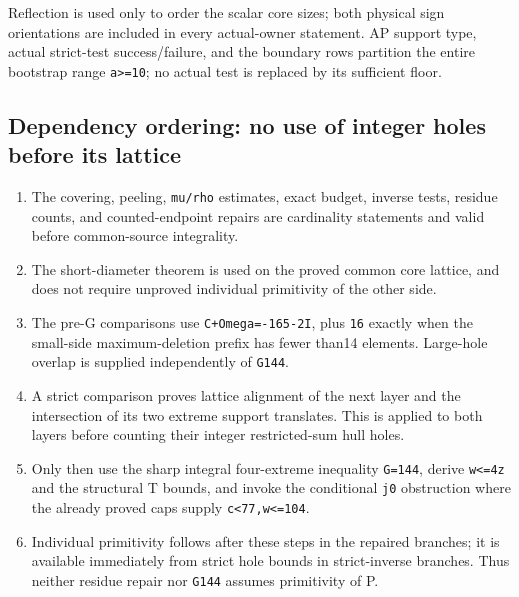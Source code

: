 \documentclass[10pt,a4paper]{article}
\theoremstyle{definition}
\providecommand{\tightlist}{\setlength{\itemsep}{0pt}\setlength{\parskip}{0pt}}
\begin{document}
Reflection is used only to order the scalar core sizes; both physical
sign orientations are included in every actual-owner statement. AP
support type,\allowbreak{} actual strict-test success/failure,\allowbreak{} and the boundary rows
partition the entire bootstrap range \texttt{a>=\allowbreak{}10}; no
actual test is replaced by its sufficient floor.

\hypertarget{dependency-ordering-no-use-of-integer-holes-before-its-lattice}{%
\subsection{Dependency ordering: no use of integer holes before its
lattice}\label{dependency-ordering-no-use-of-integer-holes-before-its-lattice}}

\begin{enumerate}
\def\labelenumi{\arabic{enumi}.}
\tightlist
\item
  The covering,\allowbreak{} peeling,\allowbreak{} \texttt{mu/\allowbreak{}rho} estimates,\allowbreak{}
  exact budget,\allowbreak{} inverse tests,\allowbreak{} residue counts,\allowbreak{} and counted-endpoint
  repairs are cardinality statements and valid before common-source
  integrality.
\item
  The short-diameter theorem is used on the proved common core lattice,\allowbreak{}
  and does not require unproved individual primitivity of the other
  side.
\item
  The pre-G comparisons use \texttt{C+\allowbreak{}Omega=\allowbreak{}-165-2I},\allowbreak{}
  plus \texttt{16} exactly when the small-side
  maximum-deletion prefix has fewer than14 elements. Large-hole overlap
  is supplied independently of \texttt{G144}.
\item
  A strict comparison proves lattice alignment of the next layer and the
  intersection of its two extreme support translates. This is applied to
  both layers before counting their integer restricted-sum hull holes.
\item
  Only then use the sharp integral four-extreme inequality
  \texttt{G=\allowbreak{}144},\allowbreak{} derive
  \texttt{w<=\allowbreak{}4z} and the structural T bounds,\allowbreak{} and
  invoke the conditional \texttt{j0} obstruction where
  the already proved caps supply \texttt{c<77,\allowbreak{}w<=\allowbreak{}104}.
\item
  Individual primitivity follows after these steps in the repaired
  branches; it is available immediately from strict hole bounds in
  strict-inverse branches. Thus neither residue repair nor
  \texttt{G144} assumes primitivity of P.
\end{enumerate}
\end{document}
